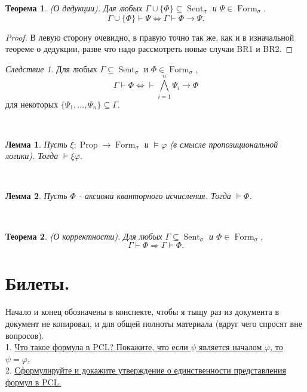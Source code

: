 \documentclass[a4paper,100pt]{article}
\theoremstyle{indented}
\newtheorem{theorem}{Теорема}
\newtheorem{lemma}{Лемма}
\theoremstyle{definition}
\theoremstyle{remark}
\newtheorem{cons}{Следствие}
\DeclareMathOperator{\ra}{\rightarrow}
\DeclareMathOperator{\Llra}{\Longleftrightarrow}
\DeclareMathOperator{\Prop}{Prop}
\DeclareMathOperator{\form}{Form}
\DeclareMathOperator{\Sent}{Sent}
\begin{document}
\begin{theorem}
  (О дедукции). Для любых $\Gamma \cup \{\Phi\}\subseteq \Sent_\sigma$ и $\Psi \in \form_\sigma$. 
  \[
    \Gamma \cup \{ \Phi \} \vdash \Psi \Llra \Gamma \vdash \Phi \ra \Psi. 
  \]
\end{theorem}

\begin{proof}
  В левую сторону очевидно, в правую точно так же, как и в изначальной теореме о дедукции, разве что надо рассмотреть новые случаи BR1 и BR2. 
\end{proof}

\begin{cons}
  Для любых $\Gamma \subseteq \Sent_\sigma$ и $\Phi \in \form_\sigma$,  
  \[
    \Gamma \vdash \Phi \Longleftrightarrow \vdash \bigwedge_{i=1}^n \Psi_i\rightarrow \Phi
  \]
  для некоторых $\{\Psi_1, \ldots, \Psi_n\}\subseteq \Gamma$.
\end{cons} \

\begin{lemma}
  Пусть $\xi: \Prop \ra \form_\sigma$ и $\vDash \varphi$ (в смысле пропозициональной логики). Тогда $\vDash \xi \varphi$. 
\end{lemma} \

\begin{lemma}
  Пусть $\Phi$ - аксиома кванторного исчисления. Тогда $\vDash \Phi$. 
\end{lemma} \

\begin{theorem}
  (О корректности). Для любых $\Gamma \subseteq \Sent_\sigma$ и $\Phi \in \form_\sigma$, 
  \[
    \Gamma \vdash \Phi \Longrightarrow \Gamma \vDash \Phi. 
  \]
\end{theorem}

\newpage

\section{Билеты.}

Начало и конец обозначены в конспекте, чтобы я тыщу раз из документа в документ не копировал, и для общей полноты материала (вдруг чего спросят вне вопросов). \\

1. \hyperlink{b1}{Что такое формула в PCL? Покажите, что если $\psi$ является началом $\varphi$, то $\psi = \varphi$.} \\ 

2. \hyperlink{b2}{Сформулируйте и докажите утверждение о единственности представления формул в PCL.} \\
\end{document}
